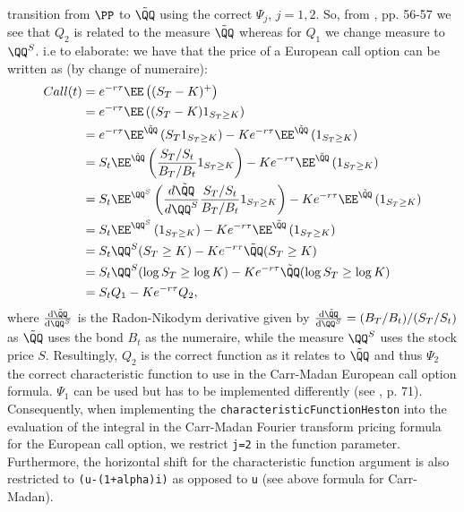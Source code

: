 \documentclass[11pt]{article}
\numberwithin{equation}{section}
\begin{document}
transition from $\PP$ to $\tilde{\QQ}$ using the correct $\Psi_j$, $j=1,2$. So, from \cite{Havrylenko2024}, pp. 56-57 we
see that $Q_2$ is related to the measure $\tilde{\QQ}$ whereas for $Q_1$ we change
measure to $\QQ^S$. i.e to elaborate: we have that the price of a European call option can be
written as (by change of numeraire):
\begin{align*}
    Call(t)&=e^{-r\tau}\EE \left ( (S_T-K)^+\right )\\
    &=e^{-r\tau}\EE \left ( (S_T-K) 1_{S_T\geq K}\right )
    \\&=e^{-r\tau} \EE^{\tilde{\QQ}} \left ( S_T 1_{S_T \geq K} \right ) - K e^{-r\tau} \EE^{\tilde{\QQ}} \left ( 1_{S_T \geq K} \right )\\
    &=S_t\EE^{\tilde{\QQ}} \left ( \frac{S_T/S_t}{B_T/B_t} 1_{S_T \geq K}\right )-Ke^{-r\tau}\EE^{\tilde{\QQ}}\left ( 1_{S_T \geq K} \right )\\
    &=S_t\EE^{\QQ^S} \left ( \frac{d\tilde{\QQ}}{d\QQ^S}\frac{S_T/S_t}{B_T/B_t} 1_{S_T \geq K} \right )-Ke^{-r\tau}\EE^{\tilde{\QQ}}\left ( 1_{S_T \geq K} \right )\\
    &=S_t \EE^{\QQ^S}  \left ( 1_{S_T\geq K}\right ) - Ke^{-r\tau} \EE^{\tilde{\QQ}}\left ( 1_{S_T\geq K}\right )
    \\&=S_t\QQ^S(S_T \geq K)-Ke^{-r\tau}\tilde{\QQ}(S_T\geq K)\\
    &=S_t\QQ^S(\log{S_T} \geq \log{K})-Ke^{-r\tau}\tilde{\QQ}(\log{S_T} \geq \log{K})\\
    &=S_tQ_1-Ke^{-r\tau}Q_2,
\end{align*} 
where $\frac{\mathrm{d}\tilde{\QQ}}{\mathrm{d}\QQ^S}$ is the Radon-Nikodym derivative given by
$\frac{\mathrm{d}\tilde{\QQ}}{\mathrm{d}\QQ^S}=(B_T/B_t)/(S_T/S_t)$ as $\tilde{\QQ}$ uses the
bond $B_t$ as the numeraire, while the measure $\QQ^S$ uses the stock price $S$.
Resultingly, $Q_2$ is the correct function as it relates to $\tilde{\QQ}$ and thus $\Psi_2$
the correct characteristic function to use in the Carr-Madan European call
option formula. $\Psi_1$ can be used but has to be implemented differently (see
\cite{Havrylenko2024}, p. 71).
Consequently, when implementing the \texttt{characteristicFunctionHeston} into
the evaluation of the integral in the Carr-Madan Fourier transform pricing
formula for the European call option, we restrict \texttt{j=2} in the function
parameter. Furthermore, the
horizontal shift for the characteristic function argument is also restricted to
\texttt{(u-(1+alpha)i)} as opposed to \texttt{u} (see above formula for Carr-Madan).
\end{document}
